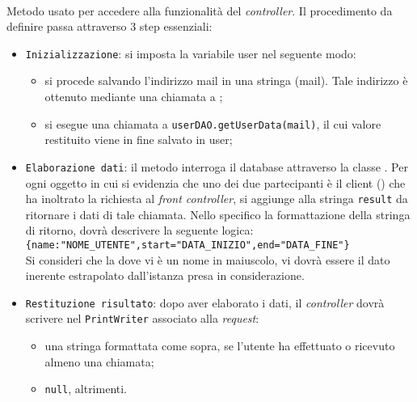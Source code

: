 \begin{description}
	
	\item{}\\
	Metodo usato per accedere alla funzionalità del \textit{controller}. Il procedimento da definire passa attraverso 3 step essenziali:
	\begin{itemize}
		\item \texttt{Inizializzazione}: si imposta la variabile user nel seguente modo:
			\begin{itemize}
				\item si procede salvando l'indirizzo mail in una stringa (mail). Tale indirizzo è ottenuto mediante una chiamata a ;
				\item si esegue una chiamata a \texttt{userDAO.getUserData(mail)}, il cui valore restituito viene in fine salvato in user;
			\end{itemize}
		\item \texttt{Elaborazione dati}: il metodo interroga il database attraverso la classe . Per ogni oggetto  in cui si evidenzia che uno dei due partecipanti è il client () che ha inoltrato la richiesta al \textit{front controller}, si aggiunge alla stringa \texttt{result} da ritornare i dati di tale chiamata. Nello specifico la formattazione della stringa di ritorno, dovrà descrivere la seguente logica:\\
		
		\verb|{name:"NOME_UTENTE",start="DATA_INIZIO",end="DATA_FINE"}|\\
		
		Si consideri che la dove vi è un nome in maiuscolo, vi dovrà essere il dato inerente estrapolato dall'istanza  presa in considerazione.
		\item \texttt{Restituzione risultato}: dopo aver elaborato i dati, il \textit{controller} dovrà scrivere nel \texttt{PrintWriter} associato alla \textit{request}:
			\begin{itemize}
				\item una stringa formattata come sopra, se l'utente ha effettuato o ricevuto almeno una chiamata;
				\item \texttt{null}, altrimenti.
			\end{itemize}
	\end{itemize}

\end{description}

